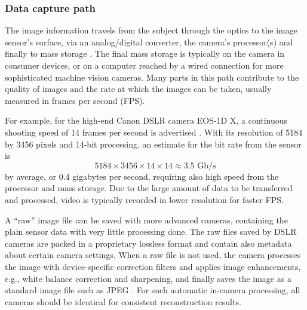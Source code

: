 
\subsubsection{Data capture path} %

The image information travels from the subject through the optics to the image sensor's surface, via an analog/digital converter, the camera's processor(s) and finally to mass storage \cite{szeliski10vision}.
The final mass storage is typically on the camera in consumer devices, or on a computer reached by a wired connection for more sophisticated machine vision cameras.
Many parts in this path contribute to the quality of images and the rate at which the images can be taken, usually measured in frames per second (FPS).



For example, for the high-end Canon DSLR camera EOS-1D X, a continuous shooting speed of 14 frames per second is advertised \cite{eos1dx}.
With its resolution of 5184 by 3456 pixels and 14-bit processing, an estimate for the bit rate from the sensor is
\begin{equation} \label{eq:eos1dspeed}
5184 \times 3456 \times 14 \times 14 \approx 3.5\text{ Gb/s}
\end{equation}
by average, or 0.4 gigabytes per second, requiring also high speed from the processor and mass storage.
Due to the large amount of data to be transferred and processed, video is typically recorded in lower resolution for faster FPS.


A ``raw'' image file can be saved with more advanced cameras, containing the plain sensor data with very little processing done.
The raw files saved by DSLR cameras are packed in a proprietary lossless format and contain also metadata about certain camera settings.
When a raw file is not used, the camera processes the image with device-specific correction filters and applies image enhancements, e.g., white balance correction and sharpening, and finally saves the image as a standard image file such as JPEG \cite[p. 412]{szeliski10vision}.
For such automatic in-camera processing, all cameras should be identical for consistent reconstruction results.

